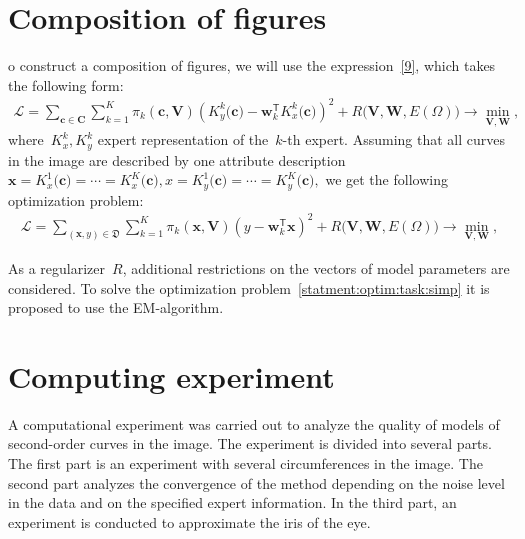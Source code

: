 \section{Composition of figures}
\label{sec:4}
o construct a composition of figures, we will use the expression~\eqref{9}, which takes the following form:
\begin{equation} 
\label{statment:optim:task}
\begin{aligned}
\mathcal{L} = \sum\limits_{\mathbf{c} \in \mathbf{C}} \sum\limits_{k = 1}^{K} \pi_k(\mathbf{c}, \mathbf{V})\left(K^{k}_y\bigr(\mathbf{c}\bigr) - \mathbf{w}_k^{\mathsf{T}}K^{k}_x\bigr(\mathbf{c}\bigr)\right)^2 + R\bigl(\mathbf{V}, \mathbf{W}, E(\Omega)\bigr) \rightarrow \min_{\mathbf{V}, \mathbf{W}},
\end{aligned}
\end{equation} 
where~$K^{k}_x, K^{k}_y$ expert representation of the~$k$-th expert. Assuming that all curves in the image are described by one attribute description $\mathbf {x} =K^{1}_x\bigr(\mathbf{c}\bigr)=\cdots=K^{K}_x\bigr(\mathbf{c}\bigr), x= K^{1}_y\bigr(\mathbf{c}\bigr)=\cdots=K^{K}_y\bigr(\mathbf{c}\bigr),$ we get the following optimization problem:
\begin{equation} 
\label{statment:optim:task:simp}
\begin{aligned}
\mathcal{L} = \sum\limits_{\left(\mathbf{x}, y\right) \in \mathfrak{D}} \sum\limits_{k = 1}^{K} \pi_k(\mathbf{x}, \mathbf{V})\left(y - \mathbf{w}_k^{\mathsf{T}}\mathbf{x}\right)^2 + R\bigl(\mathbf{V}, \mathbf{W}, E(\Omega)\bigr) \rightarrow \min_{\mathbf{V}, \mathbf{W}},
\end{aligned}
\end{equation} 

As a regularizer~$R$, additional restrictions on the vectors of model parameters are considered. To solve the optimization problem~\eqref{statment:optim:task:simp} it is proposed to use the EM-algorithm.

\section{Computing experiment}
\label{sec:5}

A computational experiment was carried out to analyze the quality of models of second-order curves in the image. The experiment is divided into several parts. The first part is an experiment with several circumferences in the image. The second part analyzes the convergence of the method depending on the noise level in the data and on the specified expert information. In the third part, an experiment is conducted to approximate the iris of the eye.

